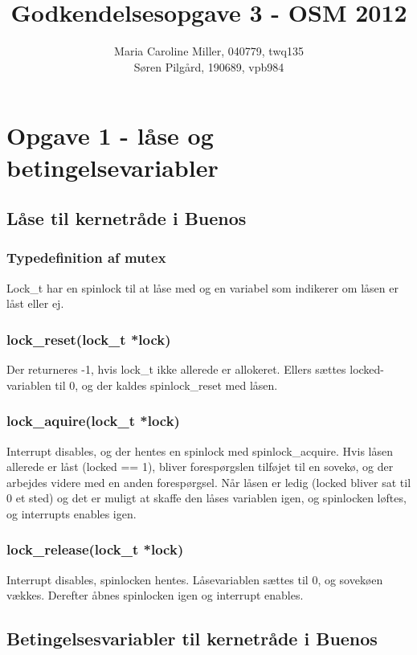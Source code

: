 \documentclass[10pt,a4paper,danish]{article}
\title{Godkendelsesopgave 3 - OSM 2012}
\author{Maria Caroline Miller, 040779, twq135 \\ Søren Pilgård, 190689, vpb984}
\begin{document}
\maketitle
\newpage


\section{Opgave 1 - låse og betingelsevariabler}
\subsection{Låse til kernetråde i Buenos}

\subsubsection{Typedefinition af mutex}
Lock\_t har en spinlock til at låse med og en variabel som indikerer om låsen er låst eller ej.

\subsubsection{lock\_reset(lock\_t *lock)}
Der returneres -1, hvis lock\_t ikke allerede er allokeret. Ellers sættes locked-variablen til 0, og der kaldes spinlock\_reset med låsen. 

\subsubsection{lock\_aquire(lock\_t *lock)}
Interrupt disables, og der hentes en spinlock med spinlock\_acquire. Hvis låsen allerede er låst (locked == 1), bliver forespørgslen tilføjet til en sovekø, og der arbejdes videre med en anden forespørgsel. Når låsen er ledig (locked bliver sat til 0 et sted) og det er muligt at skaffe den låses variablen igen, og spinlocken løftes, og interrupts enables igen.

\subsubsection{lock\_release(lock\_t *lock)}
Interrupt disables, spinlocken hentes. Låsevariablen sættes til 0, og sovekøen vækkes. Derefter åbnes spinlocken igen og interrupt enables.

\subsection{Betingelsesvariabler til kernetråde i Buenos}
\end{document}
